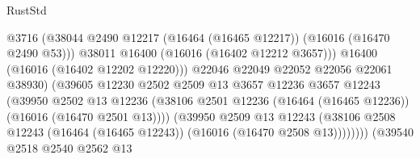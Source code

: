 \begin{lexlean}{RustStd}
\begin{coremodule}
                                              @3716
                                              (@38044
                                                @2490
                                                @12217
                                                (@16464 (@16465 @12217))
                                                (@16016 (@16470 @2490 @53)))
                                              @38011
                                              @16400
                                              (@16016 (@16402 @12212 @3657)))
                                            @16400
                                            (@16016 (@16402 @12202 @12220)))
                                          @22046
                                          @22049
                                          @22052
                                          @22056
                                          @22061
                                          @38930)
                                        (@39605
                                          @12230
                                          @2502
                                          @2509
                                          @13
                                          @3657
                                          @12236
                                          @3657
                                          @12243
                                          (@39950
                                            @2502
                                            @13
                                            @12236
                                            (@38106
                                              @2501
                                              @12236
                                              (@16464 (@16465 @12236))
                                              (@16016 (@16470 @2501 @13))))
                                          (@39950
                                            @2509
                                            @13
                                            @12243
                                            (@38106
                                              @2508
                                              @12243
                                              (@16464 (@16465 @12243))
                                              (@16016 (@16470 @2508 @13))))))))
                                  (@39540
                                    @2518
                                    @2540
                                    @2562
                                    @13

\end{coremodule}
\end{lexlean}
